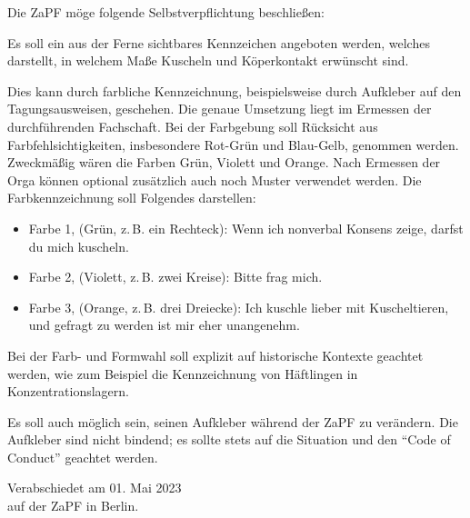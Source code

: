 
Die ZaPF möge folgende Selbstverpflichtung beschließen:

Es soll ein aus der Ferne sichtbares Kennzeichen angeboten werden, welches darstellt, in welchem Maße Kuscheln und Köperkontakt erwünscht sind.

Dies kann durch farbliche Kennzeichnung, beispielsweise durch Aufkleber auf den Tagungsausweisen, geschehen. Die genaue Umsetzung liegt im Ermessen der durchführenden Fachschaft. Bei der Farbgebung soll Rücksicht aus Farbfehlsichtigkeiten, insbesondere Rot-Grün und Blau-Gelb, genommen werden. Zweckmäßig wären die Farben Grün, Violett und Orange. Nach Ermessen der Orga können optional zusätzlich auch noch Muster verwendet werden.
Die Farbkennzeichnung soll Folgendes darstellen:
\begin{itemize}
   \item Farbe 1, (Grün, z.\,B. ein Rechteck): Wenn ich nonverbal Konsens zeige, darfst du mich kuscheln. 
   \item Farbe 2, (Violett, z.\,B. zwei Kreise): Bitte frag mich.
   \item Farbe 3, (Orange, z.\,B. drei Dreiecke): Ich kuschle lieber mit Kuscheltieren, und gefragt zu werden ist mir eher unangenehm. 
\end{itemize}
Bei der Farb- und Formwahl soll explizit auf historische Kontexte geachtet werden, wie zum Beispiel die Kennzeichnung von Häftlingen in Konzentrationslagern.

Es soll auch möglich sein, seinen Aufkleber während der ZaPF zu verändern. Die Aufkleber sind nicht bindend; es sollte stets auf die Situation und den \enquote{Code of Conduct} geachtet werden.


\vspace{1cm} 

\vfill
\begin{flushright}
Verabschiedet am 01. Mai 2023 \\
auf der ZaPF in Berlin.
\end{flushright}


